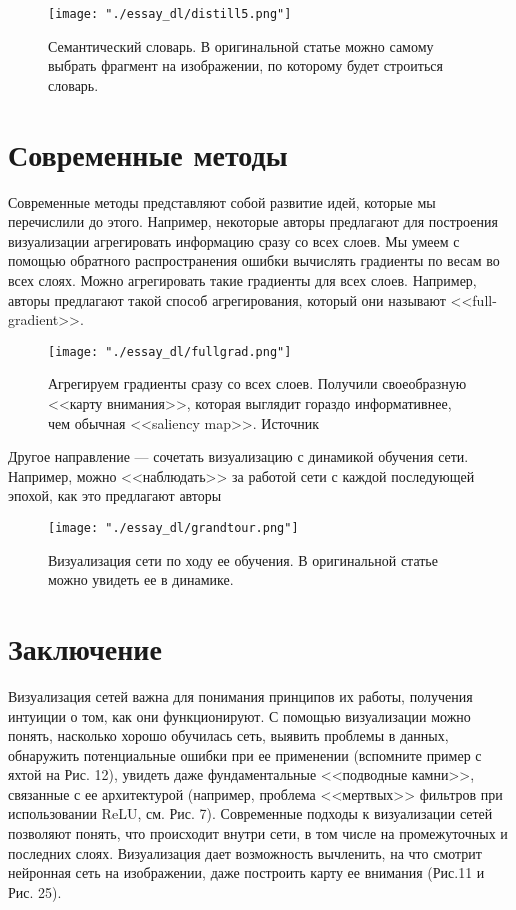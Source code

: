 \documentclass[12pt,fleqn]{article}
\begin{document}
\begin{figure}[H]
\centering
\texttt{[image: "./essay\_dl/distill5.png"]}
\caption{Семантический словарь. В оригинальной статье \cite{grad6} можно самому выбрать фрагмент на изображении, по которому будет строиться словарь.}
\end{figure}

\section{Современные методы}
Современные методы представляют собой развитие идей, которые мы перечислили до этого. Например, некоторые авторы предлагают для построения визуализации агрегировать информацию сразу со всех слоев. Мы умеем с помощью обратного распространения ошибки вычислять градиенты по весам во всех слоях. Можно агрегировать такие градиенты для всех слоев. Например, авторы \cite{fullgrad} предлагают такой способ агрегирования, который они называют <<full-gradient>>.

\begin{figure}[H]
\centering
\texttt{[image: "./essay\_dl/fullgrad.png"]}
\caption{Агрегируем градиенты сразу со всех слоев. Получили своеобразную <<карту внимания>>, которая выглядит гораздо информативнее, чем обычная <<saliency map>>. Источник \cite{fullgrad}}
\end{figure}

Другое направление --- сочетать визуализацию с динамикой обучения сети. Например, можно <<наблюдать>> за работой сети с каждой последующей эпохой, как это предлагают авторы \cite{grandtour}

\begin{figure}[H]
\centering
\texttt{[image: "./essay\_dl/grandtour.png"]}
\caption{Визуализация сети по ходу ее обучения. В оригинальной статье \cite{grandtour} можно увидеть ее в динамике.}
\end{figure}

\section{Заключение}
Визуализация сетей важна для понимания принципов их работы, получения интуиции о том, как они функционируют. С помощью визуализации можно понять, насколько хорошо обучилась сеть, выявить проблемы в данных, обнаружить потенциальные ошибки при ее применении (вспомните пример с яхтой на Рис. 12), увидеть даже фундаментальные <<подводные камни>>, связанные с ее архитектурой (например, проблема <<мертвых>> фильтров при использовании ReLU, см. Рис. 7). Современные подходы к визуализации сетей позволяют понять, что происходит внутри сети, в том числе на промежуточных и последних слоях. Визуализация дает возможность вычленить, на что смотрит нейронная сеть на изображении, даже построить карту ее внимания (Рис.11 и Рис. 25). 
\end{document}

